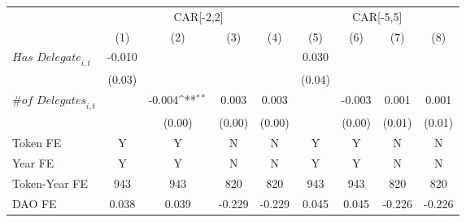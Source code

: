 {
\def\sym#1{\ifmmode^{#1}\else\(^{#1}\)\fi}
\begin{tabular}{l*{8}{c}}
\toprule
                    &\multicolumn{4}{c}{CAR[-2,2]}                                                          &\multicolumn{4}{c}{CAR[-5,5]}                                                          \\\cmidrule(lr){2-5}\cmidrule(lr){6-9}
                    &\multicolumn{1}{c}{(1)}         &\multicolumn{1}{c}{(2)}         &\multicolumn{1}{c}{(3)}         &\multicolumn{1}{c}{(4)}         &\multicolumn{1}{c}{(5)}         &\multicolumn{1}{c}{(6)}         &\multicolumn{1}{c}{(7)}         &\multicolumn{1}{c}{(8)}         \\
\midrule
$\textit{Has Delegate}_{i,t}$&      -0.010         &                     &                     &                     &       0.030         &                     &                     &                     \\
                    &      (0.03)         &                     &                     &                     &      (0.04)         &                     &                     &                     \\
$\textit{\# of Delegates}_{i,t}$&                     &      -0.004\sym{**} &       0.003         &       0.003         &                     &      -0.003         &       0.001         &       0.001         \\
                    &                     &      (0.00)         &      (0.00)         &      (0.00)         &                     &      (0.00)         &      (0.01)         &      (0.01)         \\
\midrule
Token FE            &           Y         &           Y         &           N         &           N         &           Y         &           Y         &           N         &           N         \\
Year FE             &           Y         &           Y         &           N         &           N         &           Y         &           Y         &           N         &           N         \\
Token-Year FE       &         943         &         943         &         820         &         820         &         943         &         943         &         820         &         820         \\
DAO FE              &       0.038         &       0.039         &      -0.229         &      -0.229         &       0.045         &       0.045         &      -0.226         &      -0.226         \\
\bottomrule
\end{tabular}
}
